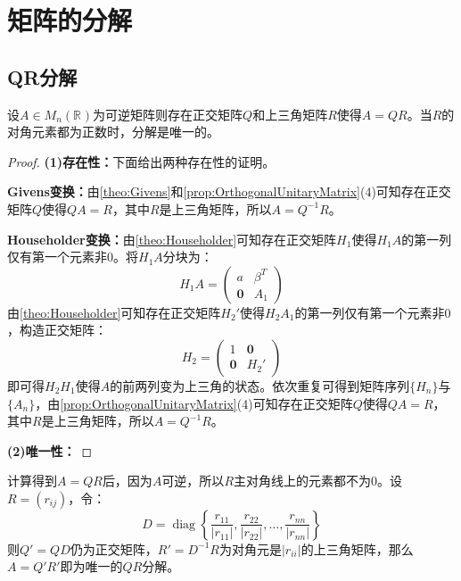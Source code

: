 \section{矩阵的分解}

\subsection{QR分解}
\begin{theorem}\label{theo:QR}
	设$A\in M_{n}(\mathbb{R}^{})$为可逆矩阵则存在正交矩阵$Q$和上三角矩阵$R$使得$A=QR$。当$R$的对角元素都为正数时，分解是唯一的。
\end{theorem}
\begin{proof}
	\textbf{(1)存在性：}下面给出两种存在性的证明。\par
	\textbf{Givens变换：}由\cref{theo:Givens}和\cref{prop:OrthogonalUnitaryMatrix}(4)可知存在正交矩阵$Q$使得$QA=R$，其中$R$是上三角矩阵，所以$A=Q^{-1}R$。\par
	\textbf{Householder变换：}由\cref{theo:Householder}可知存在正交矩阵$H_1$使得$H_1A$的第一列仅有第一个元素非$0$。将$H_1A$分块为：
	\begin{equation*}
		H_1A=
		\begin{pmatrix}
			a & \beta^T \\
			\mathbf{0} & A_1
		\end{pmatrix}
	\end{equation*}
	由\cref{theo:Householder}可知存在正交矩阵$H_2'$使得$H_2A_1$的第一列仅有第一个元素非$0$，构造正交矩阵：
	\begin{equation*}
		H_2=
		\begin{pmatrix}
			1 & \mathbf{0} \\
			\mathbf{0} & H_2'
		\end{pmatrix}
	\end{equation*}
	即可得$H_2H_1$使得$A$的前两列变为上三角的状态。依次重复可得到矩阵序列$\{H_n\}$与$\{A_n\}$，由\cref{prop:OrthogonalUnitaryMatrix}(4)可知存在正交矩阵$Q$使得$QA=R$，其中$R$是上三角矩阵，所以$A=Q^{-1}R$。\par
	\textbf{(2)唯一性：}
\end{proof}
\begin{note}
	计算得到$A=QR$后，因为$A$可逆，所以$R$主对角线上的元素都不为$0$。设$R=(r_{ij})$，令：
	\begin{equation*}
		D=\operatorname{diag}\left\{\frac{r_{11}}{|r_{11}|},\frac{r_{22}}{|r_{22}|},\dots,\frac{r_{nn}}{|r_{nn}|}\right\}
	\end{equation*}
	则$Q'=QD$仍为正交矩阵，$R'=D^{-1}R$为对角元是$|r_{ii}|$的上三角矩阵，那么$A=Q'R'$即为唯一的$QR$分解。
\end{note}

